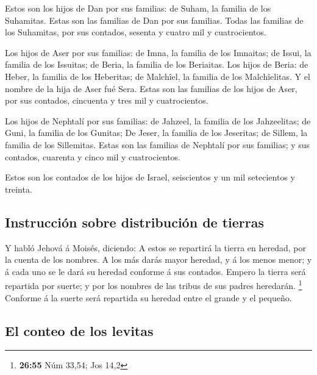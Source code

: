  Estos son los hijos de Dan por sus familias: de Suham, la
familia de los Suhamitas. Estas son las familias de Dan por sus
familias.  Todas las familias de los Suhamitas, por sus
contados, sesenta y cuatro mil y cuatrocientos.

 Los hijos de Aser por sus familias: de Imna, la familia de
los Imnaitas; de Issui, la familia de los Issuitas; de Beria, la familia
de los Beriaitas.  Los hijos de Beria: de Heber, la familia
de los Heberitas; de Malchîel, la familia de los Malchîelitas.
 Y el nombre de la hija de Aser fué Sera. 
Estas son las familias de los hijos de Aser, por sus contados, cincuenta
y tres mil y cuatrocientos.

 Los hijos de Nephtalí por sus familias: de Jahzeel, la
familia de los Jahzeelitas; de Guni, la familia de los Gunitas;
 De Jeser, la familia de los Jeseritas; de Sillem, la
familia de los Sillemitas.  Estas son las familias de
Nephtalí por sus familias; y sus contados, cuarenta y cinco mil y
cuatrocientos.

 Estos son los contados de los hijos de Israel, seiscientos
y un mil setecientos y treinta.

\hypertarget{instrucciuxf3n-sobre-distribuciuxf3n-de-tierras}{%
\subsection{Instrucción sobre distribución de
tierras}\label{instrucciuxf3n-sobre-distribuciuxf3n-de-tierras}}

 Y habló Jehová á Moisés, diciendo:  A estos
se repartirá la tierra en heredad, por la cuenta de los nombres.
 A los más darás mayor heredad, y á los menos menor; y á
cada uno se le dará su heredad conforme á sus contados. 
Empero la tierra será repartida por suerte; y por los nombres de las
tribus de sus padres heredarán. \footnote{\textbf{26:55} Núm 33,54; Jos
  14,2}  Conforme á la suerte será repartida su heredad
entre el grande y el pequeño.

\hypertarget{el-conteo-de-los-levitas}{%
\subsection{El conteo de los levitas}\label{el-conteo-de-los-levitas}}

